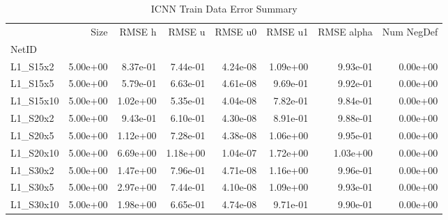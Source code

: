 \documentclass{article}
\theoremstyle{remark}
\numberwithin{equation}{subsection}
\begin{document}
\begin{table}[H]
	
\begin{tabular}{lrrrrrrr}
	\toprule
	{} &     Size &   RMSE h &   RMSE u &  RMSE u0 &  RMSE u1 &  RMSE alpha &  Num NegDef \\
	NetID     &          &          &          &          &          &             &             \\
	\midrule
	L1\_S15x2  & 5.00e+00 & 8.37e-01 & 7.44e-01 & 4.24e-08 & 1.09e+00 &    9.93e-01 &    0.00e+00 \\
	L1\_S15x5  & 5.00e+00 & 5.79e-01 & 6.63e-01 & 4.61e-08 & 9.69e-01 &    9.92e-01 &    0.00e+00 \\
	L1\_S15x10 & 5.00e+00 & 1.02e+00 & 5.35e-01 & 4.04e-08 & 7.82e-01 &    9.84e-01 &    0.00e+00 \\
	L1\_S20x2  & 5.00e+00 & 9.43e-01 & 6.10e-01 & 4.30e-08 & 8.91e-01 &    9.88e-01 &    0.00e+00 \\
	L1\_S20x5  & 5.00e+00 & 1.12e+00 & 7.28e-01 & 4.38e-08 & 1.06e+00 &    9.95e-01 &    0.00e+00 \\
	L1\_S20x10 & 5.00e+00 & 6.69e+00 & 1.18e+00 & 1.04e-07 & 1.72e+00 &    1.03e+00 &    0.00e+00 \\
	L1\_S30x2  & 5.00e+00 & 1.47e+00 & 7.96e-01 & 4.71e-08 & 1.16e+00 &    9.96e-01 &    0.00e+00 \\
	L1\_S30x5  & 5.00e+00 & 2.97e+00 & 7.44e-01 & 4.10e-08 & 1.09e+00 &    9.93e-01 &    0.00e+00 \\
	L1\_S30x10 & 5.00e+00 & 1.98e+00 & 6.65e-01 & 4.74e-08 & 9.71e-01 &    9.90e-01 &    0.00e+00 \\
	\bottomrule
\end{tabular}

\caption{ICNN Train Data Error Summary}
\end{table}
\end{document}
